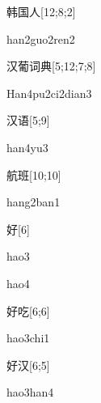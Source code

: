 \begin{verbete}{韩国人}[12;8;2]
\begin{pronuncia}{han2guo2ren2}
\end{pronuncia}
\end{verbete}

\begin{verbete}{汉葡词典}[5;12;7;8]
\begin{pronuncia}[\\]{Han4pu2ci2dian3}
\end{pronuncia}
\end{verbete}

\begin{verbete}[han4yu3]{汉语}[5;9]
\begin{pronuncia}{han4yu3}
\end{pronuncia}
\end{verbete}

\begin{verbete}{航班}[10;10]
\begin{pronuncia}{hang2ban1}
\end{pronuncia}
\end{verbete}

\begin{verbete}[hao3]{好}[6]
\begin{pronuncia}{hao3}
\end{pronuncia}
\begin{pronuncia}{hao4}
\end{pronuncia}
\end{verbete}

\begin{verbete}{好吃}[6;6]
\begin{pronuncia}{hao3chi1}
\end{pronuncia}
\end{verbete}

\begin{verbete}{好汉}[6;5]
\begin{pronuncia}{hao3han4}
\end{pronuncia}
\end{verbete}

